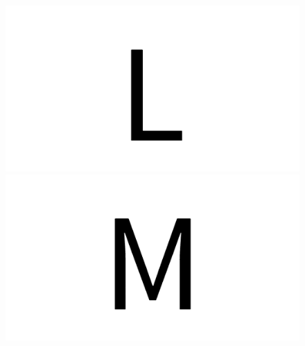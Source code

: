 \documentclass{article}
\begin{document}
\begin{figure}[H]
  \includegraphics[width=\linewidth]{u_L}
\endminipage\hfill
{}
  \includegraphics[width=\linewidth]{u_M}
\endminipage\hfill
\end{figure}
\end{document}
